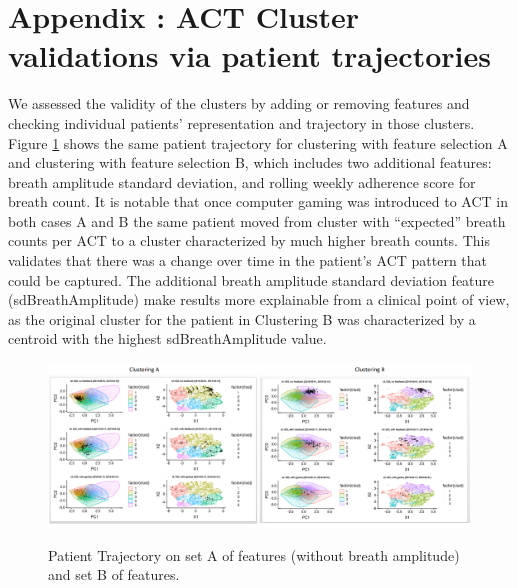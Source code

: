 \documentclass{article}
\begin{document}
\section{Appendix : ACT Cluster validations via patient trajectories}
We assessed the validity of the clusters by adding or removing features and checking individual patients’ representation and trajectory in those clusters. Figure \ref{fig:ACTclusteringAB} shows the same patient trajectory for clustering with feature selection A and clustering with feature selection B, which includes two additional features: breath amplitude standard deviation, and rolling weekly adherence score for breath count. It is notable that once computer gaming was introduced to ACT in both cases A and B the same patient moved from cluster with “expected” breath counts per ACT to a cluster characterized by much higher breath counts. This validates that there was a change over time in the patient’s ACT pattern that could be captured. The additional breath amplitude standard deviation feature (sdBreathAmplitude) make results more explainable from a clinical point of view, as the original cluster for the patient in Clustering B was characterized by a centroid with the highest sdBreathAmplitude value. 

\begin{figure}[htb]
  \centering
  \caption{Patient Trajectory on set A of features (without breath amplitude) and set B of features.}
  \includegraphics[]{ACTclusteringAB.png}
  \label{fig:ACTclusteringAB}
\end{figure}
\end{document}
